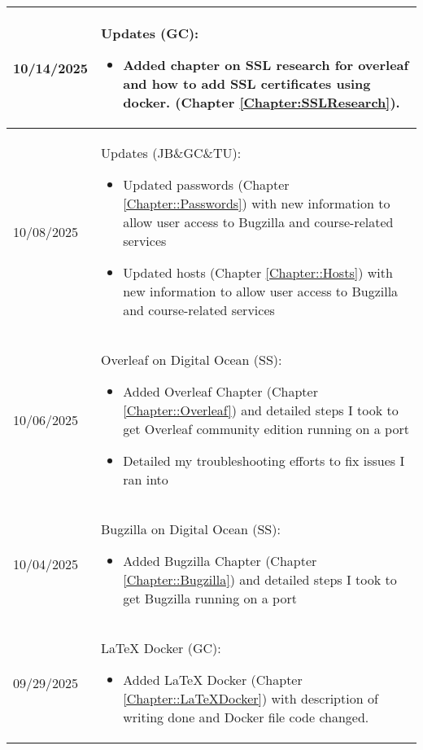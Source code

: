\begin{longtable}{|l||p{13.5cm}|}
10/14/2025 & Updates (GC):
\begin{itemize}[topsep=0pt,itemsep=0pt,parsep=0pt,partopsep=0pt,leftmargin=12pt]
\item Added chapter on SSL research for overleaf and how to add SSL certificates using docker. (Chapter \ref{Chapter:SSLResearch}). 
\end{itemize} 
\\ \hline

10/08/2025 & Updates (JB\&GC\&TU):
\begin{itemize}[topsep=0pt,itemsep=0pt,parsep=0pt,partopsep=0pt,leftmargin=12pt]
\item Updated passwords (Chapter \ref{Chapter::Passwords}) with new information to allow user access to Bugzilla and course-related services 
\item Updated hosts (Chapter \ref{Chapter::Hosts}) with new information to allow user access to Bugzilla and course-related services 
\end{itemize} 
\\ \hline

10/06/2025 & Overleaf on Digital Ocean (SS):
\begin{itemize}[topsep=0pt,itemsep=0pt,parsep=0pt,partopsep=0pt,leftmargin=12pt]
\item Added Overleaf Chapter (Chapter \ref{Chapter::Overleaf}) and detailed steps I took to get Overleaf community edition running on a port 
\item Detailed my troubleshooting efforts to fix issues I ran into 
\end{itemize} 
\\ \hline

10/04/2025 & Bugzilla on Digital Ocean (SS):
\begin{itemize}[topsep=0pt,itemsep=0pt,parsep=0pt,partopsep=0pt,leftmargin=12pt]
\item Added Bugzilla Chapter (Chapter \ref{Chapter::Bugzilla}) and detailed steps I took to get Bugzilla running on a port 
\end{itemize} 
\\ \hline

09/29/2025 & LaTeX Docker (GC):
\begin{itemize}[topsep=0pt,itemsep=0pt,parsep=0pt,partopsep=0pt,leftmargin=12pt]
\item Added LaTeX Docker (Chapter \ref{Chapter::LaTeXDocker}) with description of writing done and Docker file code changed.
\end{itemize} 
\\ \hline


\end{longtable}
